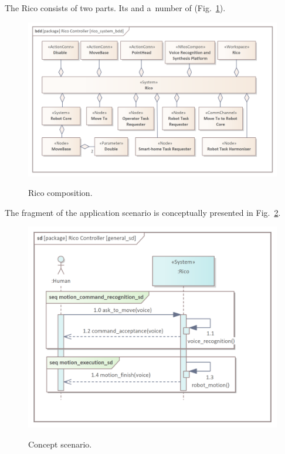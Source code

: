 \documentclass[11pt,oneside,a4paper]{report}
\begin{document}
	\newpage
	The Rico \stSystem{} consists of two parts. Its \stWorkspace{} and a~number of \stRunSystemCompon{} (Fig.~\ref{fig:rico_system_bdd}).
	
	
	\begin{figure}[H] 
		\centering
		\begin{center}
			{\includegraphics[scale=.9]{img/rico_pkg/rico_system_bdd.png}}
		\end{center}
		\caption{Rico \stSystem{} composition.} 
		\label{fig:rico_system_bdd}
	\end{figure}
	
	
	The fragment of the application scenario is conceptually presented in Fig.~\ref{fig:general_sd}.
	

	\begin{figure}[H] 
		\centering
		\begin{center}
			{\includegraphics[scale=.9]{img/rico_pkg/general_sd.png}}
		\end{center}
		\caption{Concept scenario.} 
		\label{fig:general_sd}
	\end{figure}
	
\end{document}
